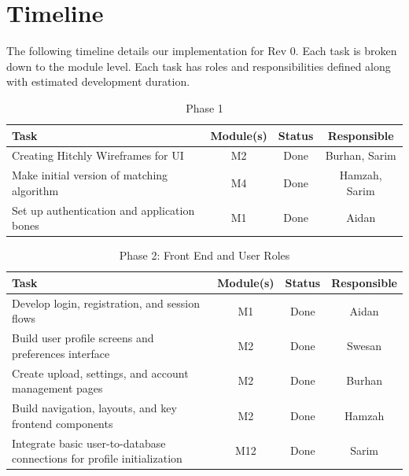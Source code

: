 \section{Timeline}
The following timeline details our implementation for Rev 0. Each task is broken down to the module level. Each task has roles and responsibilities defined along with estimated development duration.

\begin{table}[h!]
  \centering
  \caption{Phase 1}
  \begin{tabularx}{\textwidth}{|X|c|c|c|}
  \hline
  \textbf{Task} & \textbf{Module(s)} & \textbf{Status} & \textbf{Responsible} \\
  \hline
  
  Creating Hitchly Wireframes for UI & M2 & Done & Burhan, Sarim \\
  \hline

  Make initial version of matching algorithm & M4 & Done & Hamzah, Sarim \\
  \hline

  Set up authentication and application bones & M1 & Done & Aidan \\
  \hline
  \end{tabularx}
\end{table}

\begin{table}[h!]
  \centering
  \caption{Phase 2: Front End and User Roles}
  \begin{tabularx}{\textwidth}{|X|c|c|c|}
  \hline
  \textbf{Task} & \textbf{Module(s)} & \textbf{Status} & \textbf{Responsible} \\
  \hline

  Develop login, registration, and session flows & M1 & Done & Aidan \\
  \hline

  Build user profile screens and preferences interface & M2 & Done & Swesan \\
  \hline

  Create upload, settings, and account management pages & M2 & Done & Burhan \\
  \hline

  Build navigation, layouts, and key frontend components & M2 & Done & Hamzah \\
  \hline

  Integrate basic user-to-database connections for profile initialization & M12 & Done & Sarim \\
  \hline
  \end{tabularx}
\end{table}

